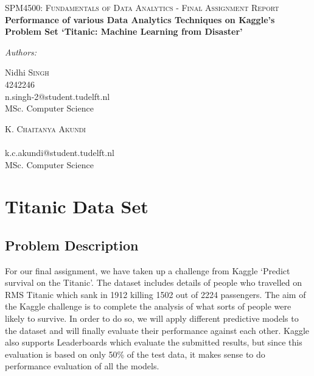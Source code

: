 \documentclass[a4paper,10pt]{report}
\date{\today}
\begin{document}



\begin{titlepage}
\begin{center}

\textsc{\Large SPM4500: Fundamentals of Data Analytics - Final Assignment Report }\\[6cm]

{ \bfseries \Large Performance of various Data Analytics Techniques on Kaggle's Problem Set `Titanic: Machine Learning from Disaster' \\[6cm] }

\begin{minipage}{0.6\textwidth}
\emph{Authors:}\\
\begin{flushleft} \large
Nidhi \textsc{Singh}\\
4242246 \\
n.singh-2@student.tudelft.nl\\
MSc. Computer Science\\
\end{flushleft}

\begin{flushright} \large
K. \textsc{Chaitanya Akundi}\\
 \\
k.c.akundi@student.tudelft.nl\\
MSc. Computer Science\\
\end{flushright}

\end{minipage}

\end{center}
\end{titlepage}

\listoffigures

\chapter{Titanic Data Set}
\section{Problem Description}
For our final assignment, we have taken up a challenge from Kaggle `Predict survival on the Titanic'. The dataset includes details of people who travelled on RMS Titanic which sank in 1912 killing 1502 out of 2224 passengers.
The aim of the Kaggle challenge is to complete the analysis of what sorts of people were likely to survive. In order to do so, we will apply different predictive models to the dataset and will finally evaluate their performance against each other. Kaggle also supports Leaderboards which evaluate the submitted results, but since this evaluation is based on only 50\% of the test data, it makes sense to do performance evaluation of all the models.
\end{document}
